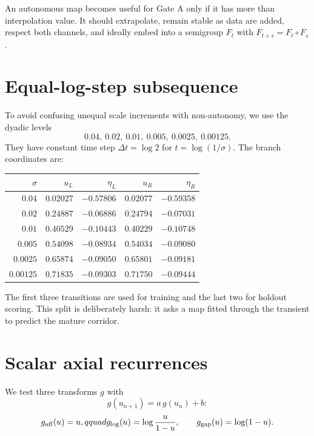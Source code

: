 \documentclass[12pt]{article}
\theoremstyle{remark}\newtheorem{remark}[theorem]{Remark}
\begin{document}
An autonomous map becomes useful for Gate A only if it has more than
interpolation value.  It should extrapolate, remain stable as data are added,
respect both channels, and ideally embed into a semigroup $F_t$ with
$F_{t+s}=F_t\circ F_s$.

\section{Equal-log-step subsequence}

To avoid confusing unequal scale increments with non-autonomy, we use the
dyadic levels
\begin{equation}\label{eq:dyadic}
 0.04,\ 0.02,\ 0.01,\ 0.005,\ 0.0025,\ 0.00125.
\end{equation}
They have constant time step $\Delta t=\log2$ for
$t=\log(1/\sigma)$.  The branch coordinates are:
\begin{center}
\small
\begin{tabular}{rrrrr}
\toprule
$\sigma$ & $u_L$ & $\eta_L$ & $u_R$ & $\eta_R$\\
\midrule
$0.04$ & $0.02027$ & $-0.57806$ & $0.02077$ & $-0.59358$\\
$0.02$ & $0.24887$ & $-0.06886$ & $0.24794$ & $-0.07031$\\
$0.01$ & $0.40529$ & $-0.10443$ & $0.40229$ & $-0.10748$\\
$0.005$ & $0.54098$ & $-0.08934$ & $0.54034$ & $-0.09080$\\
$0.0025$ & $0.65874$ & $-0.09050$ & $0.65801$ & $-0.09181$\\
$0.00125$ & $0.71835$ & $-0.09303$ & $0.71750$ & $-0.09444$\\
\bottomrule
\end{tabular}
\end{center}

The first three transitions are used for training and the last two for
holdout scoring.  This split is deliberately harsh: it asks a map fitted
through the transient to predict the mature corridor.

\section{Scalar axial recurrences}

We test three transforms $g$ with
\begin{equation}\label{eq:scalarrec}
 g(u_{n+1})=a\,g(u_n)+b:
\end{equation}
\begin{equation}
 g_{\rm aff}(u)=u,qquad
 g_{\rm log}(u)=\log\frac{u}{1-u},
 \qquad
 g_{\rm gap}(u)=\log(1-u).
\end{equation}
\end{document}
